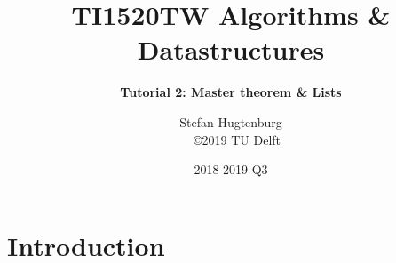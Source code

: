 \documentclass[aspectratio=169]{beamer}
\title[Algorithms \& Datastructures]{TI1520TW Algorithms \& Datastructures}
\subtitle{\color{cyan} \textbf{Tutorial 2: Master theorem \& Lists }}
\author{Stefan Hugtenburg\\ {\tiny{\qquad~~\copyright 2019 TU Delft}}}
\institute{CSE Teaching Team | EEMCS | TU Delft}
\date{2018-2019 Q3}
\begin{document}
\frame{\titlepage}

\section{Introduction}






\frame{\titlepage}
\end{document}
